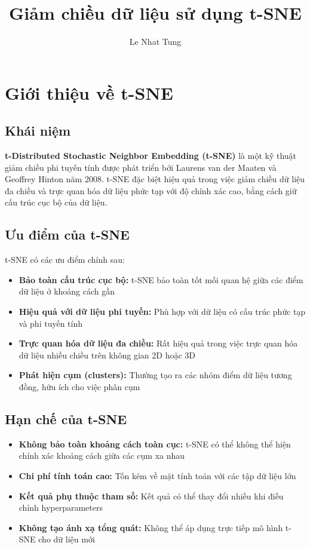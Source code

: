 \documentclass[
]{article}
\title{Giảm chiều dữ liệu sử dụng t-SNE}
\author{Le Nhat Tung}
\date{}
\begin{document}
\maketitle

{
\setcounter{tocdepth}{3}
\tableofcontents
}
\section{Giới thiệu về t-SNE}\label{giux1edbi-thiux1ec7u-vux1ec1-t-sne}

\subsection{Khái niệm}\label{khuxe1i-niux1ec7m}

\textbf{t-Distributed Stochastic Neighbor Embedding (t-SNE)} là một kỹ
thuật giảm chiều phi tuyến tính được phát triển bởi Laurens van der
Maaten và Geoffrey Hinton năm 2008. t-SNE đặc biệt hiệu quả trong việc
giảm chiều dữ liệu đa chiều và trực quan hóa dữ liệu phức tạp với độ
chính xác cao, bằng cách giữ cấu trúc cục bộ của dữ liệu.

\subsection{Ưu điểm của
t-SNE}\label{ux1b0u-ux111iux1ec3m-cux1ee7a-t-sne}

t-SNE có các ưu điểm chính sau:

\begin{itemize}
\item
  \textbf{Bảo toàn cấu trúc cục bộ:} t-SNE bảo toàn tốt mối quan hệ giữa
  các điểm dữ liệu ở khoảng cách gần
\item
  \textbf{Hiệu quả với dữ liệu phi tuyến:} Phù hợp với dữ liệu có cấu
  trúc phức tạp và phi tuyến tính
\item
  \textbf{Trực quan hóa dữ liệu đa chiều:} Rất hiệu quả trong việc trực
  quan hóa dữ liệu nhiều chiều trên không gian 2D hoặc 3D
\item
  \textbf{Phát hiện cụm (clusters):} Thường tạo ra các nhóm điểm dữ liệu
  tương đồng, hữu ích cho việc phân cụm
\end{itemize}

\subsection{Hạn chế của t-SNE}\label{hux1ea1n-chux1ebf-cux1ee7a-t-sne}

\begin{itemize}
\item
  \textbf{Không bảo toàn khoảng cách toàn cục:} t-SNE có thể không thể
  hiện chính xác khoảng cách giữa các cụm xa nhau
\item
  \textbf{Chi phí tính toán cao:} Tốn kém về mặt tính toán với các tập
  dữ liệu lớn
\item
  \textbf{Kết quả phụ thuộc tham số:} Kết quả có thể thay đổi nhiều khi
  điều chỉnh hyperparameters
\item
  \textbf{Không tạo ánh xạ tổng quát:} Không thể áp dụng trực tiếp mô
  hình t-SNE cho dữ liệu mới
\end{itemize}
\end{document}
